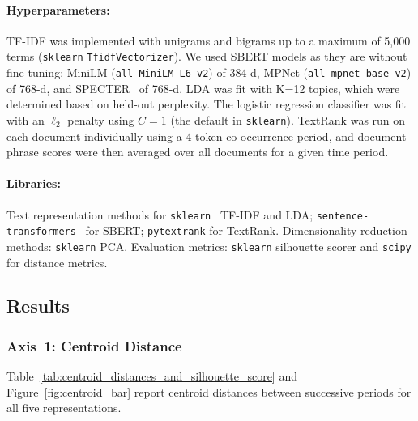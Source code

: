 \documentclass[11pt]{article}
\begin{document}
\paragraph{Hyperparameters:}
TF-IDF was implemented with unigrams and bigrams up to a maximum of 5,000 terms (\texttt{sklearn} \texttt{TfidfVectorizer}). We used SBERT models as they are without fine-tuning: MiniLM (\texttt{all-MiniLM-L6-v2}) of 384-d, MPNet (\texttt{all-mpnet-base-v2}) of 768-d, and SPECTER~\cite{specter2020cohan} of 768-d. LDA was fit with K=12 topics, which were determined based on held-out perplexity. The logistic regression classifier was fit with an $\ell_2$ penalty using $C=1$ (the default in \texttt{sklearn}). TextRank was run on each document individually using a 4-token co-occurrence period, and document phrase scores were then averaged over all documents for a given time period.

\paragraph{Libraries:}
Text representation methods for \texttt{sklearn}~\cite{sklearn} TF-IDF and LDA; \texttt{sentence-transformers}~\cite{reimers-gurevych-2019-sentence} for SBERT; \texttt{pytextrank} for TextRank. Dimensionality reduction methods: \texttt{sklearn} PCA. Evaluation metrics: \texttt{sklearn} silhouette scorer and \texttt{scipy} for distance metrics.

\subsection{Results}

\subsubsection{Axis~1: Centroid Distance}
Table~\ref{tab:centroid_distances_and_silhouette_score} and Figure~\ref{fig:centroid_bar} report centroid distances between successive periods for all five representations.

\begin{table}[ht]
\centering
\caption{Centroid distances and silhouette scores for all five representations.}
\label{tab:centroid_distances_and_silhouette_score}
\end{table}
\end{document}
